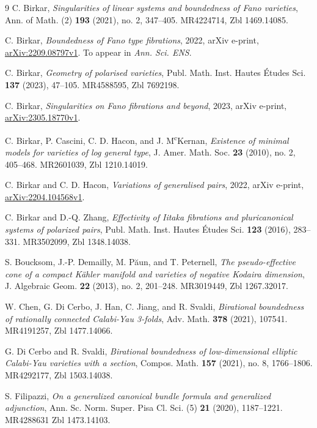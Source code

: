 \documentclass[11pt]{ip-journal}
\theoremstyle{definition}
\begin{document}
\begin{thebibliography}{9}
C. Birkar,
{\it Singularities of linear systems and boundedness of {F}ano varieties},
Ann. of Math. (2)
{\bf 193}
(2021),
no. 2,
347--405.
MR4224714,
Zbl 1469.14085.

C. Birkar,
{\it Boundedness of {F}ano type fibrations},
2022,
arXiv e-print, 
\href{https://arxiv.org/abs/2209.08797}{arXiv:2209.08797v1}.
To appear in 
{\it Ann. Sci. ENS}.

C. Birkar,
{\it Geometry of polarised varieties},
Publ. Math. Inst. Hautes \'{E}tudes Sci.
{\bf 137}
(2023),
47--105.
MR4588595,
Zbl 7692198.

C. Birkar,
{\it Singularities on {F}ano fibrations and beyond}, 
2023,
arXiv e-print, 
\href{https://arxiv.org/abs/2305.18770}{arXiv:2305.18770v1}.

C. Birkar, 
P. Cascini, 
C. D. Hacon, 
and 
J. M\textsuperscript{c}Kernan,
{\it Existence of minimal models for varieties of log general type},
J. Amer. Math. Soc.
{\bf 23}
(2010),
no. 2, 
405--468.
MR2601039, 
Zbl 1210.14019.

C. Birkar and C. D. Hacon, 
{\it Variations of generalised pairs},
2022,
arXiv e-print, 
\href{https://arxiv.org/abs/2204.10456}{arXiv:2204.104568v1}.

C. Birkar and D.-Q. Zhang,
{\it Effectivity of {I}itaka fibrations and pluricanonical systems of polarized pairs},
Publ. Math. Inst. Hautes \'{E}tudes Sci.
{\bf 123}
(2016),
283--331.
MR3502099, 
Zbl 1348.14038.

S. Boucksom, 
J.-P. Demailly, 
M. P\u{a}un, 
and 
T. Peternell,
{\it The pseudo-effective cone of a compact {K}\"{a}hler manifold and varieties of negative {K}odaira dimension},
J. Algebraic Geom.
{\bf 22}
(2013),
no. 2,
201--248.
MR3019449,
Zbl 1267.32017.

W. Chen, 
G. Di Cerbo, 
J. Han, 
C. Jiang, 
and 
R. Svaldi, 
{\it Birational boundedness of rationally connected {C}alabi-{Y}au 3-folds},
Adv. Math.
{\bf 378}
(2021),
107541.
MR4191257,
Zbl 1477.14066.

G. Di Cerbo 
and 
R. Svaldi,
{\it Birational boundedness of low-dimensional elliptic {C}alabi-{Y}au varieties with a section},
Compos. Math.
{\bf 157}
(2021),
no. 8,
1766--1806.
MR4292177,
Zbl 1503.14038.

S. Filipazzi, 
{\it On a generalized canonical bundle formula and generalized adjunction},
Ann. Sc. Norm. Super. Pisa Cl. Sci. (5)
{\bf 21}
(2020),
1187--1221.
MR4288631
Zbl 1473.14103.


\end{thebibliography}
\end{document}
